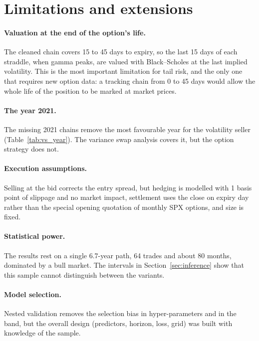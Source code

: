 \documentclass[11pt,a4paper]{article}
\begin{document}
\section{Limitations and extensions}\label{sec:limitations}

\paragraph{Valuation at the end of the option's life.} The cleaned chain covers 15 to 45 days to expiry, so the last 15 days of each straddle, when gamma peaks, are valued with Black--Scholes at the last implied volatility. This is the most important limitation for tail risk, and the only one that requires new option data: a tracking chain from 0 to 45 days would allow the whole life of the position to be marked at market prices.

\paragraph{The year 2021.} The missing 2021 chains remove the most favourable year for the volatility seller (Table~\ref{tab:vs_year}). The variance swap analysis covers it, but the option strategy does not.

\paragraph{Execution assumptions.} Selling at the bid corrects the entry spread, but hedging is modelled with 1 basis point of slippage and no market impact, settlement uses the close on expiry day rather than the special opening quotation of monthly SPX options, and size is fixed.

\paragraph{Statistical power.} The results rest on a single 6.7-year path, 64 trades and about 80 months, dominated by a bull market. The intervals in Section~\ref{sec:inference} show that this sample cannot distinguish between the variants.

\paragraph{Model selection.} Nested validation removes the selection bias in hyper-parameters and in the band, but the overall design (predictors, horizon, loss, grid) was built with knowledge of the sample.
\end{document}
